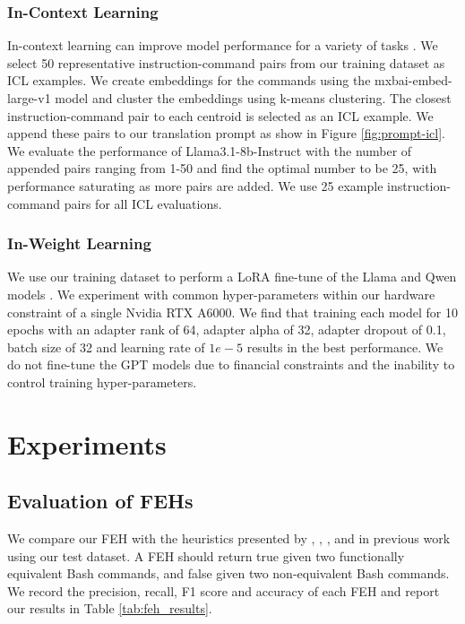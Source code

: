 \documentclass[11pt]{article}
\begin{document}
\subsubsection{In-Context Learning}
\label{sec:in-context-learning}
In-context learning can improve model performance for a variety of tasks \cite{gpt3, icl}. We select 50 representative instruction-command pairs from our training dataset as ICL examples. We create embeddings for the commands using the mxbai-embed-large-v1 model and cluster the embeddings using k-means clustering. The closest instruction-command pair to each centroid is selected as an ICL example. We append these pairs to our translation prompt as show in Figure \ref{fig:prompt-icl}. We evaluate the performance of Llama3.1-8b-Instruct with the number of appended pairs ranging from 1-50 and find the optimal number to be 25, with performance saturating as more pairs are added. We use 25 example instruction-command pairs for all ICL evaluations.

\subsubsection{In-Weight Learning}
\label{sec:in-weight-learning}
We use our training dataset to perform a LoRA fine-tune of the Llama and Qwen models \cite{lora}. We experiment with common hyper-parameters within our hardware constraint of a single Nvidia RTX A6000. We find that training each model for 10 epochs with an adapter rank of 64, adapter alpha of 32, adapter dropout of 0.1, batch size of 32 and learning rate of $1e-5$ results in the best performance. We do not fine-tune the GPT models due to financial constraints and the inability to control training hyper-parameters.


\section{Experiments}
\label{sec:experiments}

\subsection{Evaluation of FEHs}
\label{sec:experiments-feh}
We compare our FEH with the heuristics presented by \citet{tfidf}, \citet{bleu}, \citet{NL2CMD-Comp}, \citet{InterCode} and \citet{tsed} in previous work using our test dataset. A FEH should return true given two functionally equivalent Bash commands, and false given two non-equivalent Bash commands. We record the precision, recall, F1 score and accuracy of each FEH and report our results in Table \ref{tab:feh_results}.
\end{document}

